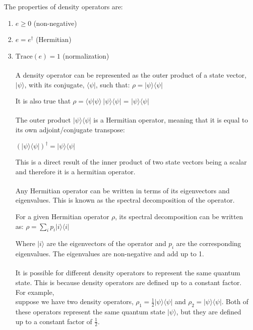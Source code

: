 \documentclass{article}
\begin{document}
The properties of density operators are:
\begin{enumerate}
\item $e \geq 0$ (non-negative)
\item $e = e^{\dagger}$ (Hermitian)
\item $\text{Trace}(e) = 1$ (normalization)
\\
\\
A density operator can be represented as the outer product of a state vector, $|\psi\rangle$, with its conjugate, $\langle\psi|$, such that:
$\rho = |\psi\rangle\langle\psi|$ 

It is also true that 
$\rho = \langle\psi|\psi\rangle \ |\psi\rangle\langle\psi|$ =  $|\psi\rangle\langle\psi|$
\\
\\
The outer product $|\psi\rangle\langle\psi|$ is a Hermitian operator, meaning that it is equal to its own adjoint/conjugate transpose:

$(|\psi\rangle\langle\psi|)^{\dagger} = |\psi\rangle\langle\psi|$

This is a direct result of the inner product of two state vectors being a scalar and therefore it is a hermitian operator.
\\
\\
Any Hermitian operator can be written in terms of its eigenvectors and eigenvalues. This is known as the spectral decomposition of the operator.

For a given Hermitian operator $\rho$, its spectral decomposition can be written as:
$\rho = \sum_i p_i |i\rangle\langle i|$

Where $|i\rangle$ are the eigenvectors of the operator and $p_i$ are the corresponding eigenvalues. The eigenvalues are non-negative and add up to 1.
\\
\\
It is possible for different density operators to represent the same quantum state. This is because density operators are defined up to a constant factor. For example,\\ suppose we have two density operators, $\rho_1 = \frac{1}{2} |\psi\rangle\langle\psi|$ and $\rho_2 = |\psi\rangle\langle\psi|$. Both of these operators represent the same quantum state $|\psi\rangle$, but they are defined up to a constant factor of $\frac{1}{2}$.




\end{enumerate}
\end{document}
